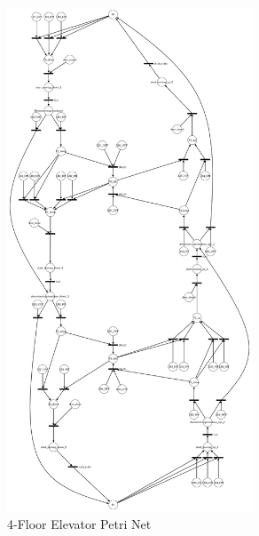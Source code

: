 \documentclass[12pt	]{article}
\begin{document}
\begin{figure}[h]
	\centering
	\includegraphics[width=0.65\textwidth]{Images/img12.png}
	\caption{4-Floor Elevator Petri Net}
	\label{fig:4-Floor Elevator Petri Net}
\end{figure}








\newpage


\end{document}
